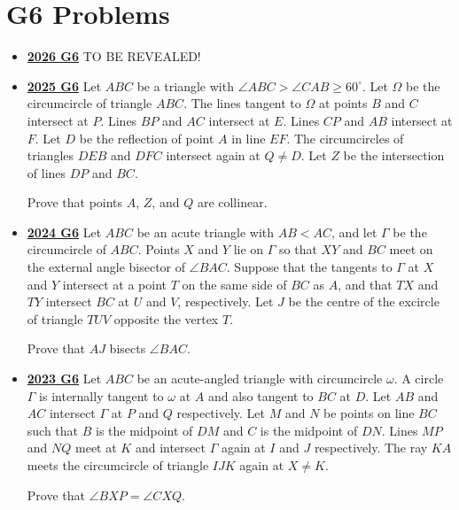 \documentclass[11pt]{scrartcl}
\begin{document}
\section*{G6 Problems}  \label{G6}
\begin{itemize}[leftmargin=*]

\item \href{https://www.imo-official.org/assets/documents/problems/2026/IMO2026SL.pdf}{\textbf{2026 G6}} TO BE REVEALED!

\item \href{https://artofproblemsolving.com/community/c6h3866848p38676932}{\textbf{2025 G6}} Let $ABC$ be a triangle with $\angle ABC > \angle CAB \geqslant 60^\circ$. Let $\Omega$ be the circumcircle of triangle $ABC$. The lines tangent to $\Omega$ at points $B$ and $C$ intersect at $P$. Lines $BP$ and $AC$ intersect at $E$. Lines $CP$ and $AB$ intersect at $F$. Let $D$ be the reflection of point $A$ in line $EF$. The circumcircles of triangles $DEB$ and $DFC$ intersect again at $Q \ne D$. Let $Z$ be the intersection of lines $DP$ and $BC$.

Prove that points $A$, $Z$, and $Q$ are collinear.


\item \href{https://artofproblemsolving.com/community/c6h3610439p35340907}{\textbf{2024 G6}} Let $ABC$ be an acute triangle with $AB < AC$, and let $\Gamma$ be the circumcircle of $ABC$. Points $X$ and $Y$ lie on $\Gamma$ so that $XY$ and $BC$ meet on the external angle bisector of $\angle BAC$. Suppose that the tangents to $\Gamma$ at $X$ and $Y$ intersect at a point $T$ on the same side of $BC$ as $A$, and that $TX$ and $TY$ intersect $BC$ at $U$ and $V$, respectively. Let $J$ be the centre of the excircle of triangle $TUV$ opposite the vertex $T$.

Prove that $AJ$ bisects $\angle BAC$.
\item \href{https://artofproblemsolving.com/community/c6h3359733p31218391}{\textbf{2023 G6}} Let $ABC$ be an acute-angled triangle with circumcircle $\omega$. A circle $\Gamma$ is internally tangent to $\omega$ at $A$ and also tangent to $BC$ at $D$. Let $AB$ and $AC$ intersect $\Gamma$ at $P$ and $Q$ respectively. Let $M$ and $N$ be points on line $BC$ such that $B$ is the midpoint of $DM$ and $C$ is the midpoint of $DN$. Lines $MP$ and $NQ$ meet at $K$ and intersect $\Gamma$ again at $I$ and $J$ respectively. The ray $KA$ meets the circumcircle of triangle $IJK$ again at $X\neq K$.

Prove that $\angle BXP = \angle CXQ$.


\end{itemize}
\end{document}
